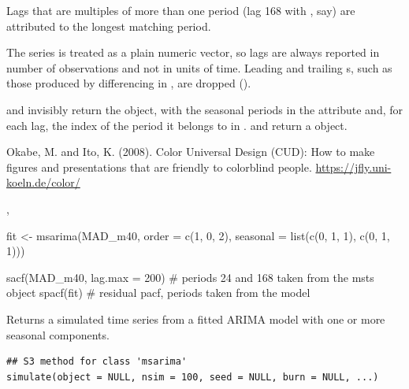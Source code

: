 \documentclass[a4paper]{book}
\begin{document}
%
\begin{Details}
Lags that are multiples of more than one period (lag 168 with
, say) are attributed to the longest matching period.

The series is treated as a plain numeric vector, so lags are always reported in
number of observations and not in units of time. Leading and trailing s,
such as those produced by differencing in , are dropped
().
\end{Details}
%
\begin{Value}
 and  invisibly return the  object, with
the seasonal periods in the  attribute and, for each lag, the index
of the period it belongs to in .  and 
return a  object.
\end{Value}
%
\begin{References}
Okabe, M. and Ito, K. (2008). Color Universal Design (CUD): How to make figures
and presentations that are friendly to colorblind people.
\url{https://jfly.uni-koeln.de/color/}
\end{References}
%
\begin{SeeAlso}
, 
\end{SeeAlso}
%
\begin{Examples}
\begin{ExampleCode}
fit <- msarima(MAD_m40, order = c(1, 0, 2),
               seasonal = list(c(0, 1, 1), c(0, 1, 1)))

sacf(MAD_m40, lag.max = 200)   # periods 24 and 168 taken from the msts object
spacf(fit)                     # residual pacf, periods taken from the model

\end{ExampleCode}
\end{Examples}
%
\begin{Description}
Returns a simulated time series from a fitted ARIMA model with one or more seasonal
components.
\end{Description}
%
\begin{Usage}
\begin{verbatim}
## S3 method for class 'msarima'
simulate(object = NULL, nsim = 100, seed = NULL, burn = NULL, ...)
\end{verbatim}
\end{Usage}
\end{document}
